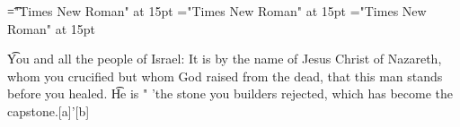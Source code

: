 \documentclass[a4paper]{article}
\begin{document}
 
\pagestyle{plain} 
\font\t="Times New Roman" at 15pt
\font\verset="Times New Roman" at 15pt
\font\salvationt="Times New Roman" at 15pt

\pagestyle{fancy} 

\t{You and all the people of Israel: It is by the name of Jesus Christ of Nazareth, whom you crucified but whom God raised from the dead, that this man stands before you healed. }\t{He is " 'the stone you builders rejected, which has become the capstone.[a]'[b] }
\end{document}

